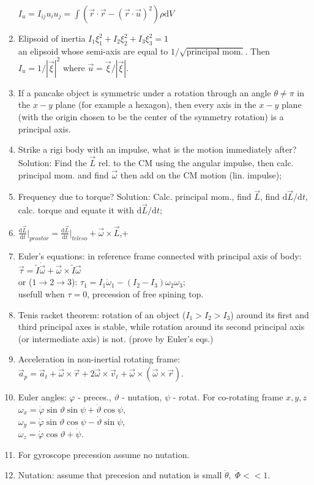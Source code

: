 \documentclass{article}
\renewcommand\d{\mathrm d}
\begin{document}
\begin{multicols}{3}
\begin{enumerate}
            $I_{u}=I_{ij}u_iu_j=\int(\vec r\cdot\vec r-(\vec r\cdot\vec u)^2)\rho\d V$
        \item Elipsoid of inertia $I_1\xi^2_1+I_2\xi^2_2+I_3\xi^2_3=1$\\
            an elipsoid whose semi-axis are equal to $1/\sqrt{\text{principal mom.}}$. Then $I_u=1/|\vec\xi|^2$ where $\vec u=\vec\xi/|\vec\xi|$.
        \item If a pancake object is symmetric under a rotation through an angle $\theta\neq\pi$ in the $x-y$ plane (for example a hexagon), then every axis in the $x-y$ plane (with the origin chosen to be the center of the symmetry rotation) is a principal axis.
        \item Strike a rigi body with an impulse, what is the motion immediately after? Solution: Find the $\vec L$ rel. to the CM using the angular impulse, then calc. principal mom. and find $\vec\omega$ then add on the CM motion (lin. impulse);
        \item Frequency due to torque? Solution: Calc. principal mom., find $\vec L$, find $\d\vec L/\d t$, calc. torque and equate it with $\d\vec L/\d t$;
        \item $\frac{\d\vec L}{\d t}\big\rvert_{prostor}=\frac{\d\vec L}{\d t}\big\rvert_{teleso}+\vec\omega\times\vec L$,+
        \item Euler's equations: in reference frame connected with principal axis of body: $\vec\tau=\tilde I\dot{\vec{\omega}}+\vec\omega\times\tilde I\vec\omega$\\
            or ($1\to2\to3$): $\tau_1=I_1\dot\omega_1-(I_2-I_3)\omega_2\omega_3$;\\
            usefull when $\tau=0$, precession of free spining top.
        \item Tenis racket theorem: rotation of an object ($I_1>I_2>I_3$) around its first and third principal axes is stable, while rotation around its second principal axis (or intermediate axis) is not. (prove by Euler's eqs.)
        \item Acceleration in non-inertial rotating frame:\\
            $\vec a_p=\vec a_t+\dot{\vec\omega}\times\vec r+2\vec\omega\times\vec v_t+\vec\omega\times(\vec\omega\times\vec r)$.
        \item Euler angles: $\varphi$ - preces., $\vartheta$ - nutation, $\psi$ - rotat.
                For co-rotating frame $x,y,z$\\
            $\omega_x=\dot\varphi\sin\vartheta\sin\psi+\dot\vartheta\cos\psi$,\\
            $\omega_y=\dot\varphi\sin\vartheta\cos\psi-\dot\vartheta\sin\psi$,\\
            $\omega_z=\dot\varphi\cos\vartheta+\dot\psi$.
        \item For gyroscope precession assume no nutation.
        \item Nutation: assume that precesion and nutation is small $\dot\theta,\;\dot\Phi << 1$.
    \end{enumerate}


\end{multicols}
\end{document}
